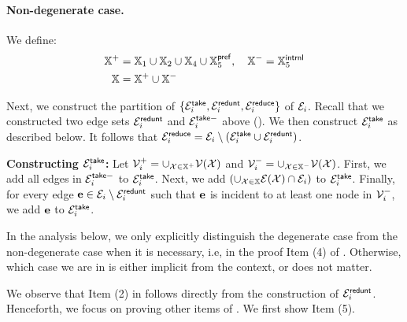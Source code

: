  \paragraph{Non-degenerate case.~} We define:
 \begin{equation}\label{eq:MathbbX1E}
 	\begin{split}
 		\mathbb{X}^{+} &=    \mathbb{X}_1\cup \mathbb{X}_2\cup \mathbb{X}_4 \cup \mathbb{X}_5^{\mathsf{pref}}, \quad
 		\mathbb{X}^{-} = \mathbb{X}_5^{\mathsf{intrnl}}\\
 		\mathbb{X} &= 	\mathbb{X}^{+}\cup \mathbb{X}^{-} 
 	\end{split}
 \end{equation}

 
 Next, we construct the partition of $\{\mathcal{E}^{\mathsf{take}}_i, \mathcal{E}^{\mathsf{redunt}}_i, \mathcal{E}_i^{\mathsf{reduce}}\}$ of $\mathcal{E}_i$. Recall that we constructed two edge sets $\mathcal{E}_i^{\mathsf{redunt}}$  and $\mathcal{E}^{\mathsf{take}-}_i$ above (). We then construct $\mathcal{E}_i^{\mathsf{take}}$ as described below. It follows that $\mathcal{E}^{\mathsf{reduce}}_i = \mathcal{E}_i\setminus (\mathcal{E}_i^{\mathsf{take}}\cup \mathcal{E}_i^{\mathsf{redunt}})$.
 
 \begin{tcolorbox}
 	\hypertarget{EiPartition1E}{}
 	\textbf{Constructing $\mathcal{E}_i^{\mathsf{take}}$:} Let $\mathcal{V}_i^{+} = \cup_{\mathcal{X}\in \mathbb{X}^{+}}\mathcal{V}(\mathcal{X})$ and $\mathcal{V}_i^{-} = \cup_{\mathcal{X}\in \mathbb{X}^{-}}\mathcal{V}(\mathcal{X})$. 	First, we add all edges in  $\mathcal{E}^{\mathsf{take}-}_i$ to $\mathcal{E}^{\mathsf{take}}_i$. Next, we add $ (\cup_{\mathcal{X}\in \mathbb{X}}\mathcal{E}(\mathcal{X})\cap \mathcal{E}_i)$ to $\mathcal{E}_i^{\mathsf{take}}$. Finally, for every edge $\mathbf{e} \in \mathcal{E}_i\setminus \mathcal{E}_i^{\mathsf{redunt}}$ such that $\mathbf{e}$ is incident to at least one node in $\mathcal{V}_i^{-}$, we add $\mathbf{e}$ to   $\mathcal{E}_i^{\mathsf{take}}$.
 \end{tcolorbox}
 
  
In the analysis below, we only explicitly  distinguish the degenerate case from the non-degenerate case when it is necessary, i.e, in the proof Item (4) of . Otherwise, which case we are in is either implicit from the context, or does not matter.

We observe that Item (2) in  follows directly from the construction of $\mathcal{E}_i^{\mathsf{redunt}}$. Henceforth, we focus on proving other items of .  We first show Item (5).


